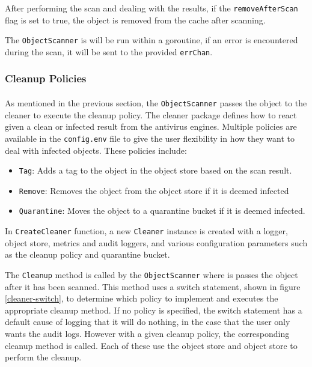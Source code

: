 \documentclass[12pt, conference, final, a4paper, onecolumn, compsoc]{IEEEtran}
\begin{document}
After performing the scan and dealing with the results, if the
\texttt{removeAfterScan} flag is set to true, the object is removed from the
cache after scanning.

The \texttt{ObjectScanner} is will be run within a goroutine, if an error is
encountered during the scan, it will be sent to the provided \texttt{errChan}.

\subsubsection*{Cleanup Policies}
\paragraph{}


As mentioned in the previous section, the \texttt{ObjectScanner} passes the
object to the cleaner to execute the cleanup policy. The cleaner package defines
how to react given a clean or infected result from the antivirus engines.
Multiple policies are available in the \texttt{config.env} file to give the user
flexibility in how they want to deal with infected objects. These policies
include:

\begin{itemize}
  \item \texttt{Tag}: Adds a tag to the object in the object store based on the
        scan result.
  \item \texttt{Remove}: Removes the object from the object store if it is
        deemed infected
  \item \texttt{Quarantine}: Moves the object to a quarantine bucket if it is
        deemed infected.
\end{itemize}

In \texttt{CreateCleaner} function, a new \texttt{Cleaner} instance is created
with a logger, object store, metrics and audit loggers, and various
configuration parameters such as the cleanup policy and quarantine bucket.

The \texttt{Cleanup} method is called by the \texttt{ObjectScanner} where is
passes the object after it has been scanned. This method uses a switch
statement, shown in figure \ref{cleaner-switch}, to determine which policy to
implement and executes the appropriate cleanup method. If no policy is
specified, the switch statement has a default cause of logging that it will do
nothing, in the case that the user only wants the audit logs. However with a
given cleanup policy, the corresponding cleanup method is called. Each of these
use the object store and object store to perform the cleanup.
\end{document}

